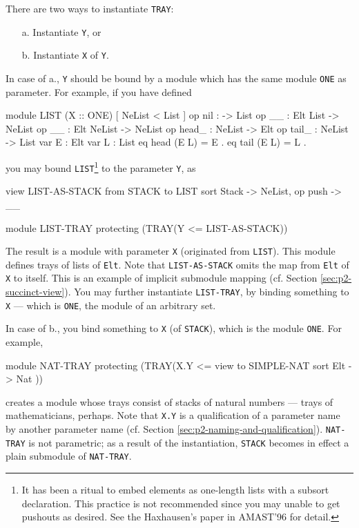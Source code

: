 \documentclass[a4paper]{memoir}
\begin{document}
There are two ways to instantiate \verb|TRAY|:
\begin{itemize}
\item[a.] Instantiate \verb|Y|, or
\item[b.] Instantiate \verb|X| of \verb|Y|.
\end{itemize}
In case of a., \verb|Y| should be bound by a module which has
the same module \verb|ONE| as parameter. For example,
if you have defined
\begin{vvtm}
\begin{ccode}
  module LIST (X :: ONE) {
    [ NeList < List ]
    op nil : -> List
    op __ : Elt List -> NeList
    op __ : Elt NeList -> NeList
    op head_ : NeList -> Elt
    op tail_ : NeList -> List
    var E : Elt
    var L : List
    eq head (E L) = E .
    eq tail (E L) = L .
  }
\end{ccode}
\end{vvtm}
you may bound \verb|LIST|\footnote{
It has been a ritual to embed elements as one-length lists with
a subsort declaration. This practice is not recommended since you
may unable to get pushouts as desired. See the Haxhausen's paper
in AMAST'96 for detail.
} to the parameter \verb|Y|, as
\begin{vvtm}
\begin{ccode}
  view LIST-AS-STACK from STACK to LIST {
    sort Stack -> NeList,
    op push -> __
  }

  module LIST-TRAY {
    protecting (TRAY(Y <= LIST-AS-STACK))
  }
\end{ccode}
\end{vvtm}
The result is a module with parameter \verb|X| (originated from \verb|LIST|).
This module defines trays of lists of \verb|Elt|. Note that
\verb|LIST-AS-STACK| omits the map from \verb|Elt| of \verb|X| to itself.
This is an example of implicit submodule mapping
(cf. Section \ref{sec:p2-succinct-view}).
You may further instantiate \verb|LIST-TRAY|, by binding something to
\verb|X| --- which is \verb|ONE|, the module of an arbitrary set.

In case of b., you bind something to \verb|X| (of \verb|STACK|), which
is the module \verb|ONE|. For example,
\begin{vvtm}
\begin{ccode}
  module NAT-TRAY {
    protecting (TRAY(X.Y <= view to SIMPLE-NAT { sort Elt -> Nat }))
  }
\end{ccode}
\end{vvtm}
creates a module whose trays consist of
stacks of natural numbers ---
trays of mathematicians, perhaps. Note that \verb|X.Y| is a
qualification of a parameter name by another parameter name
(cf. Section \ref{sec:p2-naming-and-qualification}).
\verb|NAT-TRAY| is not parametric; as a result of the instantiation,
\verb|STACK| becomes in effect a plain submodule of \verb|NAT-TRAY|.
\end{document}
